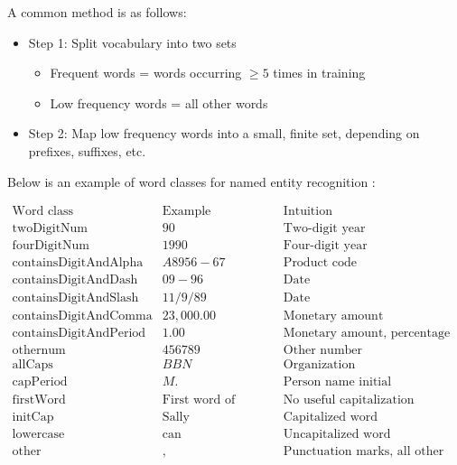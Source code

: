 A common method is as follows:
\begin{itemize}
  \item Step 1: Split vocabulary into two sets
    \begin{itemize}
      \item Frequent words = words occurring $\geq 5$ times in training
      \item Low frequency words = all other words
    \end{itemize}
  \item Step 2: Map low frequency words into a small, finite set, depending on prefixes, suffixes, etc.
\end{itemize}
  
 Below is an example of word classes for named entity recognition \cite{bikelSW99}:
  
  \[
    \begin{array}{l|l|l}
      \text{Word class} & \text{Example}  & \text{Intuition} \\
      \hline
      \text{twoDigitNum} & 90 & \text{Two-digit year} \\
      \text{fourDigitNum} & 1990 & \text{Four-digit year} \\
      \text{containsDigitAndAlpha} & A8956-67 & \text{Product code} \\
      \text{containsDigitAndDash} & 09-96 & \text{Date} \\
      \text{containsDigitAndSlash} & 11/9/89 & \text{Date} \\
      \text{containsDigitAndComma} & 23,000.00 & \text{Monetary amount} \\
      \text{containsDigitAndPeriod} & 1.00 & \text{Monetary amount, percentage} \\
      \text{othernum} & 456789 & \text{Other number} \\
      \text{allCaps} & BBN & \text{Organization} \\
      \text{capPeriod} & M. & \text{Person name initial} \\
      \text{firstWord} & \text{First word of sentence} & \text{No useful capitalization information} \\
      \text{initCap} & \text{Sally} & \text{Capitalized word} \\
      \text{lowercase} & \text{can} & \text{Uncapitalized word} \\
      \text{other} & , & \text{Punctuation marks, all other words} \\
    \end{array}
  \]
 
